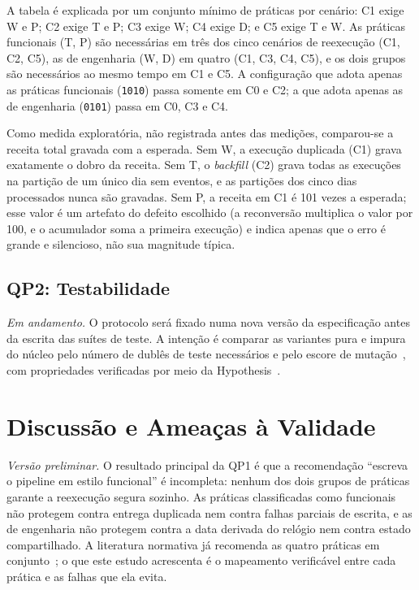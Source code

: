 A tabela é explicada por um conjunto mínimo de práticas por cenário: C1 exige W e P; C2 exige T e P; C3 exige W; C4 exige D; e C5 exige T e W. As práticas funcionais (T, P) são necessárias em três dos cinco cenários de reexecução (C1, C2, C5), as de engenharia (W, D) em quatro (C1, C3, C4, C5), e os dois grupos são necessários ao mesmo tempo em C1 e C5. A configuração que adota apenas as práticas funcionais (\texttt{1010}) passa somente em C0 e C2; a que adota apenas as de engenharia (\texttt{0101}) passa em C0, C3 e C4.

Como medida exploratória, não registrada antes das medições, comparou-se a receita total gravada com a esperada. Sem W, a execução duplicada (C1) grava exatamente o dobro da receita. Sem T, o \emph{backfill} (C2) grava todas as execuções na partição de um único dia sem eventos, e as partições dos cinco dias processados nunca são gravadas. Sem P, a receita em C1 é 101 vezes a esperada; esse valor é um artefato do defeito escolhido (a reconversão multiplica o valor por 100, e o acumulador soma a primeira execução) e indica apenas que o erro é grande e silencioso, não sua magnitude típica.

\subsection{QP2: Testabilidade}

\emph{Em andamento.} O protocolo será fixado numa nova versão da especificação antes da escrita das suítes de teste. A intenção é comparar as variantes pura e impura do núcleo pelo número de dublês de teste necessários e pelo escore de mutação~\citep{jia2011}, com propriedades verificadas por meio da Hypothesis~\citep{maciver2019}.

\section{Discussão e Ameaças à Validade}
\label{sec:discussao}

\emph{Versão preliminar.} O resultado principal da QP1 é que a recomendação ``escreva o pipeline em estilo funcional'' é incompleta: nenhum dos dois grupos de práticas garante a reexecução segura sozinho. As práticas classificadas como funcionais não protegem contra entrega duplicada nem contra falhas parciais de escrita, e as de engenharia não protegem contra a data derivada do relógio nem contra estado compartilhado. A literatura normativa já recomenda as quatro práticas em conjunto~\citep{beauchemin2018,airflow2023}; o que este estudo acrescenta é o mapeamento verificável entre cada prática e as falhas que ela evita.

